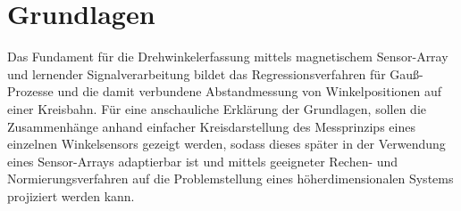 %

\chapter{Grundlagen}\label{ch:grundlagen}

Das Fundament für die Drehwinkelerfassung mittels magnetischem Sensor-Array und lernender Signalverarbeitung 
\cite{Schuethe2019}\cite{Schuethe2020}\cite{Schuethe2020a} bildet das Regressionsverfahren für Gauß-Prozesse 
\cite{Rasmussen2006} und die damit verbundene Abstandmessung von Winkelpositionen auf einer Kreisbahn.
Für eine anschauliche Erklärung der Grundlagen, sollen die Zusammenhänge anhand einfacher Kreisdarstellung des 
Messprinzips eines einzelnen Winkelsensors gezeigt werden, sodass dieses später in der Verwendung eines Sensor-Arrays 
adaptierbar ist und mittels geeigneter Rechen- und Normierungsverfahren auf die Problemstellung eines 
höherdimensionalen Systems projiziert werden kann.










